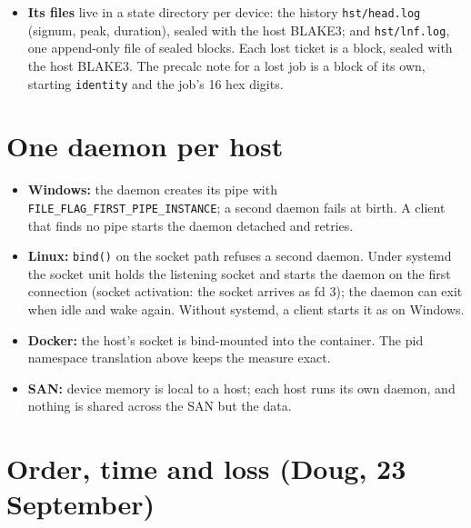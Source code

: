 \begin{itemize}
\begin{itemize}
\item On each sweep it reads the device's memory and the job's pid, and warns if the job grew.
\item After every change it runs admission and tells each admitted client.
\item It keeps each process's identity: a handle on Windows, a pidfd on Linux. A reused pid can never pass for the old process.
\end{itemize}
\item \textbf{Its files} live in a state directory per device: the history \texttt{hst/\allowbreak{}head.\allowbreak{}log} (signum, peak, duration), sealed with the host BLAKE3; and \texttt{hst/\allowbreak{}lnf.\allowbreak{}log}, one append-only file of sealed blocks. Each lost ticket is a block, sealed with the host BLAKE3. The precalc note for a lost job is a block of its own, starting \texttt{identity} and the job's 16 hex digits.
\end{itemize}

\section{\texorpdfstring{One daemon per host}{One daemon per host}}

\begin{itemize}
\item \textbf{Windows:} the daemon creates its pipe with \texttt{FILE\_\allowbreak{}FLAG\_\allowbreak{}FIRST\_\allowbreak{}PIPE\_\allowbreak{}INSTANCE}; a second daemon fails at birth. A client that finds no pipe starts the daemon detached and retries.
\item \textbf{Linux:} \texttt{bind()} on the socket path refuses a second daemon. Under systemd the socket unit holds the listening socket and starts the daemon on the first connection (socket activation: the socket arrives as fd 3); the daemon can exit when idle and wake again. Without systemd, a client starts it as on Windows.
\item \textbf{Docker:} the host's socket is bind-mounted into the container. The pid namespace translation above keeps the measure exact.
\item \textbf{SAN:} device memory is local to a host; each host runs its own daemon, and nothing is shared across the SAN but the data.
\end{itemize}

\section{\texorpdfstring{Order, time and loss (Doug, 23 September)}{Order, time and loss (Doug, 23 September)}}

